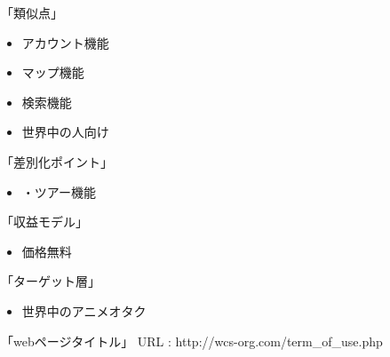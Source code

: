 「類似点」
\begin{itemize}
\item アカウント機能
\item マップ機能
\item 検索機能
\item 世界中の人向け
\end{itemize}
「差別化ポイント」
\begin{itemize}
\item ・ツアー機能
\end{itemize}
「収益モデル」
\begin{itemize}
\item 価格無料
\end{itemize}
「ターゲット層」
\begin{itemize}
\item 世界中のアニメオタク
\end{itemize}
「webページタイトル」
URL : http://wcs-org.com/term\_of\_use.php
